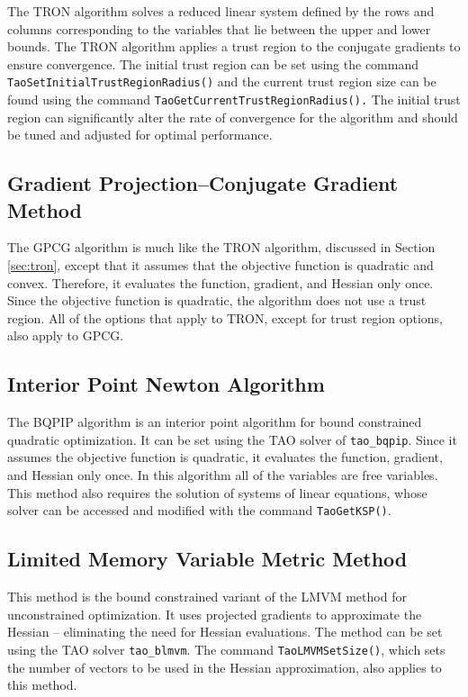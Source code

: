 The TRON algorithm solves a reduced linear system
defined by the rows and columns corresponding to the variables that
lie between the upper and lower bounds.
The TRON algorithm applies a trust region to the 
conjugate gradients to ensure convergence.  The initial trust region
can be set using the command 
{\tt TaoSetInitialTrustRegionRadius()}
and the current trust region size can be found using the command
{\tt TaoGetCurrentTrustRegionRadius().}
The initial trust region can significantly alter the 
rate of convergence for the algorithm and should be
tuned and adjusted for optimal performance.


\subsection{Gradient Projection--Conjugate Gradient Method}
The GPCG \cite{more-toraldo} algorithm is much like the TRON algorithm, discussed in
Section \ref{sec:tron}, except that
it assumes that the objective function is quadratic and convex.
Therefore, it evaluates the function, gradient, and Hessian only
once.
Since the objective function
is quadratic, the algorithm does not use a trust region.  
All of the options that apply to TRON, except for trust region
options,  also apply to GPCG.

\subsection{Interior Point Newton Algorithm}\label{sec:bqpip}
The BQPIP algorithm is an interior point algorithm for bound
constrained quadratic optimization.  It can be set using the
TAO solver of {\tt tao\_bqpip}.
Since it assumes the objective function is quadratic, 
it evaluates the function, gradient, and Hessian only once.
In this algorithm all of the variables are free variables.
This method also requires the solution of systems of linear equations,
whose solver can be accessed and modified 
with the command {\tt TaoGetKSP()}.

\subsection{Limited Memory Variable Metric Method}

This method is the bound constrained variant of the LMVM method for
unconstrained optimization.  It uses projected gradients to approximate
the Hessian -- eliminating the need for Hessian evaluations.
The method can be set using the TAO solver {\tt tao\_blmvm}.
The command {\tt TaoLMVMSetSize()}, which sets the number
of vectors to be used in the Hessian approximation, 
also applies to this method.

